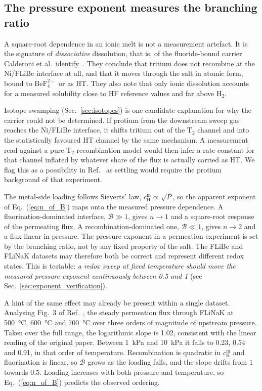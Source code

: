 \documentclass[5p]{elsarticle}
\newcommand{\cm}[1]{c^{\mathrm{m}}_{#1}}   %
\newcommand{\Bra}{\mathcal{B}}             %
\begin{document}
\subsection{The pressure exponent measures the branching ratio}
\label{sec:exponent_meaning}

A square-root dependence in an ionic melt is not a measurement artefact.
It is the signature of \emph{dissociative} dissolution, that is, of the fluoride-bound carrier Calderoni et al.\ identify~\cite{calderoni_measurement_2008}.
They conclude that tritium does not recombine at the Ni/FLiBe interface at all, and that it moves through the salt in atomic form, bound to $\mathrm{BeF_4^{2-}}$ or as HT. 
They also note that only ionic dissolution accounts for a measured solubility close to HF reference values and far above $\mathrm{H_2}$.

Isotope swamping (Sec.~\ref{sec:isotopes}) is one candidate explanation for why the carrier could not be determined.
If protium from the downstream sweep gas reaches the Ni/FLiBe interface, it shifts tritium out of the $\mathrm{T_2}$ channel and into the statistically favoured HT channel by the same mechanism.
A measurement read against a pure $\mathrm{T_2}$ recombination model would then infer a rate constant for that channel inflated by whatever share of the flux is actually carried as HT.
We flag this as a possibility in Ref.~\cite{calderoni_measurement_2008} as settling would require the protium background of that experiment.

The metal-side loading follows Sieverts' law, $\cm{\mathrm{H}} \propto \sqrt{P}$, so the apparent exponent of Eq.~(\ref{eq:n_of_B}) maps onto the measured pressure dependence.
A fluorination-dominated interface, $\Bra \gg 1$, gives $n \rightarrow 1$ and a square-root response of the permeating flux.
A recombination-dominated one, $\Bra \ll 1$, gives $n \rightarrow 2$ and a flux linear in pressure.
The pressure exponent in a permeation experiment is set by the branching ratio, not by any fixed property of the salt.
The FLiBe and FLiNaK datasets may therefore both be correct and represent different redox states.
This is testable: \emph{a redox sweep at fixed temperature should move the measured pressure exponent continuously between 0.5 and 1} (see Sec.~\ref{sec:exponent_verification}).

A hint of the same effect may already be present within a single dataset.
Analysing Fig.~3 of Ref.~\cite{satoshi_fukada_hydrogen_2006}, the steady permeation flux through FLiNaK at \qty{500}{\celsius}, \qty{600}{\celsius} and \qty{700}{\celsius} over three orders of magnitude of upstream pressure.
Taken over the full range, the logarithmic slope is \num{1.02}, consistent with the linear reading of the original paper.
Between \qty{1}{\kilo\pascal} and \qty{10}{\kilo\pascal} it falls to \num{0.23}, \num{0.54} and \num{0.91}, in that order of temperature.
Recombination is quadratic in $\cm{\mathrm{H}}$ and fluorination is linear, so $\Bra$ grows as the loading falls, and the slope drifts from $1$ towards $0.5$.
Loading increases with both pressure and temperature, so Eq.~(\ref{eq:n_of_B}) predicts the observed ordering.
\end{document}
